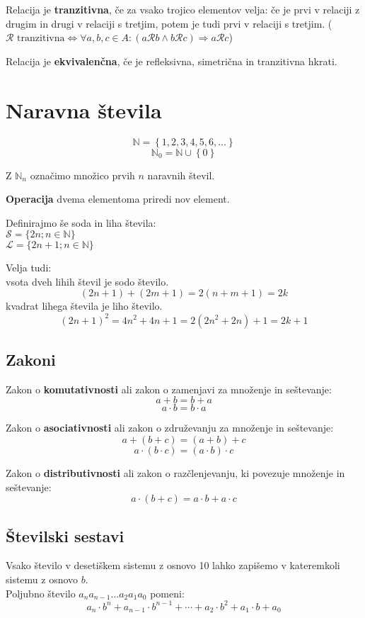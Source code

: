 \documentclass[a4paper,oneside,12pt,fleqn]{article}
\def\N{\ensuremath{\mathbb N}}
\newcommand\krat\cdot
\newcommand{\Rel}{\mathcal{R}}
\renewcommand\implies\Rightarrow
\renewcommand\iff\Leftrightarrow
\numberwithin{equation}{section}
\begin{document}
Relacija je \textbf{tranzitivna}, če za vsako trojico elementov velja: če je prvi v relaciji z
drugim in drugi v relaciji s tretjim, potem je tudi prvi v relaciji s tretjim.
($\Rel \text{ tranzitivna} \iff \forall a, b, c \in A\colon (a \Rel b \land b \Rel c) \implies a \Rel c$)

Relacija je \textbf{ekvivalenčna}, če je refleksivna, simetrična in tranzitivna hkrati.

\section{Naravna števila}
\label{sec:naravna}
\[ \N = \left\{1, 2, 3, 4, 5, 6, \ldots \right\} \]
\[ \N_0 = \N \cup \left\{ 0 \right\} \]

Z $\N_n$ označimo množico prvih $n$ naravnih števil.

\textbf{Operacija} dvema elementoma priredi nov element.

Definirajmo še soda in liha števila: \\
$\mathcal S = \{2n; n \in \N \}$ \\
$\mathcal L = \{2n+1; n \in \N \}$

Velja tudi: \\
vsota dveh lihih števil je sodo število.
\[ (2n+1) + (2m+1) = 2(n+m+1) = 2k \]
kvadrat lihega števila je liho število.
\[ (2n+1)^2 = 4n^2 + 4n + 1 = 2(2n^2 + 2n) + 1 = 2k+1 \]

\subsection{Zakoni}
\label{sec:naravna:zakoni}
Zakon o \textbf{komutativnosti} ali zakon o zamenjavi za množenje in seštevanje:
\[ a + b =  b + a \]
\[ a \krat b =  b \krat a \]

Zakon o \textbf{asociativnosti} ali zakon o združevanju za množenje in seštevanje:
\[ a + (b + c) = (a + b) + c \]
\[ a \krat (b \krat c) = (a \krat b) \krat c \]

Zakon o \textbf{distributivnosti} ali zakon o razčlenjevanju, ki povezuje množenje in seštevanje:
\[ a \krat (b + c) = a \krat b + a \krat c \]

\subsection{Številski sestavi}
Vsako število v desetiškem sistemu z osnovo 10 lahko zapišemo v kateremkoli sistemu
z osnovo $b$. \\
Poljubno število $a_na_{n-1}\!\ldots a_2a_1a_0$ pomeni:
\[ a_n \krat b^n + a_{n-1} \krat b^{n-1} + \cdots + a_2 \krat b^2 +a_1 \krat b + a_0 \]
\end{document}
